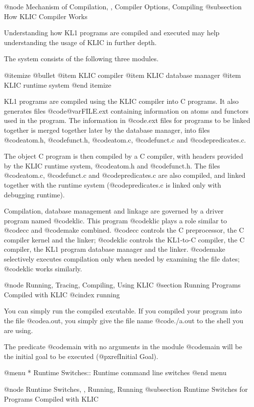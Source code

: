 {{{{@node Mechanism of Compilation,  , Compiler Options, Compiling
@subsection How KLIC Compiler Works

Understanding how KL1 programs are compiled and executed may help
understanding the usage of KLIC in further depth.

The system consists of the following three modules.

@itemize @bullet
@item
KLIC compiler
@item
KLIC database manager
@item
KLIC runtime system
@end itemize

KL1 programs are compiled using the KLIC compiler into C programs.  It
also generates files @code{@var{FILE}.ext} containing information on
atoms and functors used in the program.  The information in @code{.ext}
files for programs to be linked together is merged together later by the
database manager, into files @code{atom.h}, @code{funct.h},
@code{atom.c}, @code{funct.c} and @code{predicates.c}.

The object C program is then compiled by a C compiler, with headers
provided by the KLIC runtime system, @code{atom.h} and @code{funct.h}.
The files @code{atom.c}, @code{funct.c} and @code{predicates.c} are also
compiled, and linked together with the runtime system
(@code{predicates.c} is linked only with debugging runtime).

Compilation, database management and linkage are governed by a driver
program named @code{klic}.  This program @code{klic} plays a role
similar to @code{cc} and @code{make} combined.  @code{cc} controls the C
preprocessor, the C compiler kernel and the linker; @code{klic} controls
the KL1-to-C compiler, the C compiler, the KL1 program database manager
and the linker.  @code{make} selectively executes compilation only when
needed by examining the file dates; @code{klic} works similarly.

@node Running, Tracing, Compiling, Using KLIC
@section Running Programs Compiled with KLIC
@cindex running

You can simply run the compiled excutable.  If you compiled your program
into the file @code{a.out}, you simply give the file name @code{./a.out}
to the shell you are using.

The predicate @code{main} with no arguments in the module @code{main}
will be the initial goal to be executed (@pxref{Initial Goal}).

@menu
* Runtime Switches::            Runtime command line switches
@end menu

@node Runtime Switches,  , Running, Running
@subsection Runtime Switches for Programs Compiled with KLIC

}}}}
